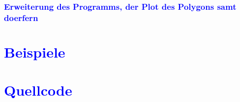 \documentclass{article}
\begin{document}
\subsubsection{\textcolor{blue}{Erweiterung des Programms, der Plot des Polygons samt doerfern}}
\begin{center}

\end{center}
\newpage
\section{\textcolor{blue}{Beispiele}}
\begin{center}

\end{center}
\section{\textcolor{blue}{Quellcode}}
\end{document}
